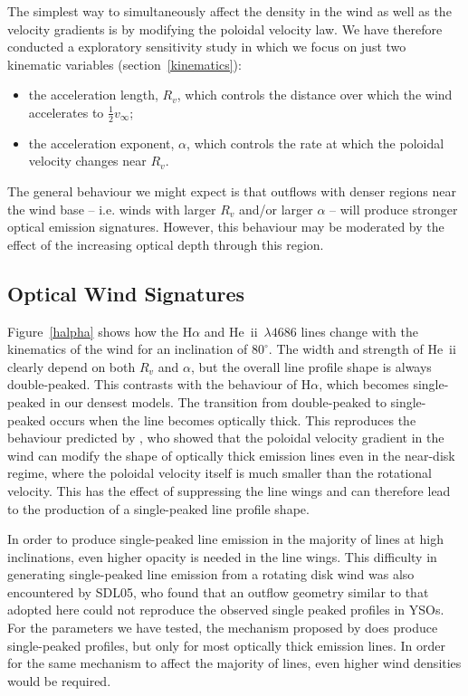 \documentclass[preprint, a4paper, 11pt]{aastex}
\begin{document}
The simplest way to simultaneously affect the density in the wind as
well as the velocity gradients is by modifying the poloidal velocity
law. We have therefore conducted a exploratory sensitivity study in
which we focus on just two kinematic variables (section~\ref{kinematics}):

\begin{itemize}
 	\item the acceleration length, $R_v$, which controls the
        distance over which the wind accelerates to $\frac{1}{2}v_{\infty}$;
 	\item the acceleration exponent, $\alpha$, which controls the rate 
 	at which the poloidal velocity changes near $R_v$.
\end{itemize} 
The general behaviour we might expect is that outflows with denser
regions near the wind base -- i.e. winds with larger $R_{v}$ and/or
larger $\alpha$ -- will produce stronger optical emission signatures. 
However, this behaviour may be moderated by the effect of the increasing
optical depth through this region.

\subsection{Optical Wind Signatures}
\label{modelb_opt}

Figure~\ref{halpha} shows how the H$\alpha$ and 
He~{\sc ii}~$\lambda 
4686$ lines change with the kinematics of the wind for an inclination
of $80^\circ$. The width and strength of He~{\sc ii} clearly depend on
both $R_v$ and $\alpha$, but the overall line profile shape is always
double-peaked. This contrasts with the behaviour of H$\alpha$, which
becomes single-peaked in our densest models. The transition from
double-peaked to single-peaked occurs when the line becomes optically
thick. This reproduces the behaviour predicted by \cite{MC96}, who
showed that the poloidal velocity gradient in the wind can modify the
shape of optically thick emission lines even in the near-disk regime,
where the poloidal velocity itself is much smaller than the rotational
velocity. This has the effect of suppressing the line wings and
can therefore lead to the production of a single-peaked line profile
shape.

In order to produce single-peaked line emission in the majority of
lines at high inclinations, even higher opacity is needed in the
line wings. This difficulty in generating single-peaked line emission
from a rotating disk wind was also encountered by SDL05, who found
that an outflow geometry similar to that adopted here could not 
reproduce the observed single peaked profiles in YSOs. For the
parameters we have tested, the mechanism proposed by \cite{MC96} does
produce single-peaked profiles, but only for most optically thick
emission lines. In order for the same mechanism to affect the majority
of lines, even higher wind densities would be required.  
\end{document}
